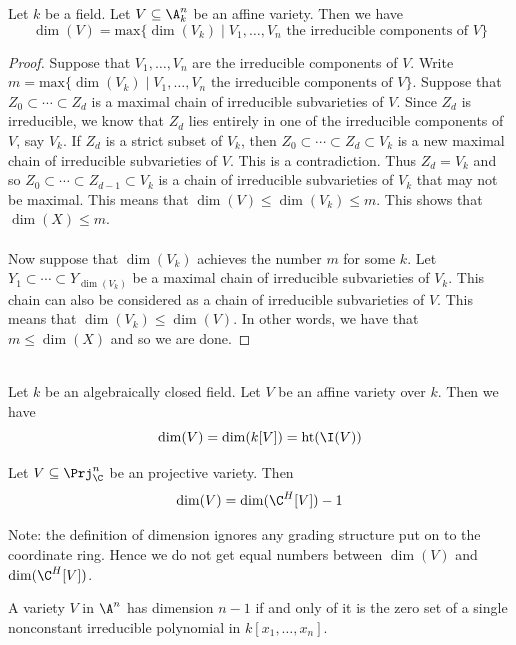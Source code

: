 \documentclass[a4paper]{article}
\begin{document}
\begin{lmm}{}{} Let $k$ be a field. Let $V\subseteq\A_k^n$ be an affine variety. Then we have $$\dim(V)=\text{max}\{\dim(V_k)\;|\;V_1,\dots,V_n\text{ the irreducible components of }V\}$$ 
\begin{proof}
Suppose that $V_1,\dots,V_n$ are the irreducible components of $V$. Write $m=\text{max}\{\dim(V_k)\;|\;V_1,\dots,V_n\text{ the irreducible components of }V\}$. Suppose that $Z_0\subset\cdots\subset Z_d$ is a maximal chain of irreducible subvarieties of $V$. Since $Z_d$ is irreducible, we know that $Z_d$ lies entirely in one of the irreducible components of $V$, say $V_k$. If $Z_d$ is a strict subset of $V_k$, then $Z_0\subset\cdots\subset Z_d\subset V_k$ is a new maximal chain of irreducible subvarieties of $V$. This is a contradiction. Thus $Z_d=V_k$ and so $Z_0\subset\cdots\subset Z_{d-1}\subset V_k$ is a chain of irreducible subvarieties of $V_k$ that may not be maximal. This means that $\dim(V)\leq\dim(V_k)\leq m$. This shows that $\dim(X)\leq m$. \\~\\

Now suppose that $\dim(V_k)$ achieves the number $m$ for some $k$. Let $Y_1\subset\cdots\subset Y_{\dim(V_k)}$ be a maximal chain of irreducible subvarieties of $V_k$. This chain can also be considered as a chain of irreducible subvarieties of $V$. This means that $\dim(V_k)\leq\dim(V)$. In other words, we have that $m\leq\dim(X)$ and so we are done. 
\end{proof}
\end{lmm}

\begin{prp}{}{}\\
Let $k$ be an algebraically closed field. Let $V$ be an affine variety over $k$. Then we have $$\dim(V)=\dim(k[V])=\text{ht}(\I(V))$$
\end{prp}

\begin{prp}{}{} Let $V\subseteq\Prj_\C^n$ be an projective variety. Then $$\dim(V)=\dim(\C^H[V])-1$$
\end{prp}

Note: the definition of dimension ignores any grading structure put on to the coordinate ring. Hence we do not get equal numbers between $\dim(V)$ and $\dim(\C^H[V])$. 

\begin{prp}{}{} A variety $V$ in $\A^n$ has dimension $n-1$ if and only of it is the zero set of a single nonconstant irreducible polynomial in $k[x_1,\dots,x_n]$. 
\end{prp}
\end{document}
